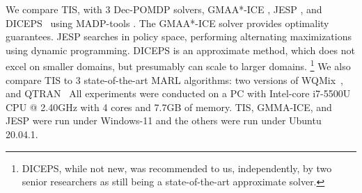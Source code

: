 \documentclass[runningheads]{llncs}
\newcommand{\citep}{\cite}
\begin{document}
We compare TIS, with 3 Dec-POMDP solvers, GMAA*-ICE \citep{GMAAICE}, JESP \citep{JESP}, 
and DICEPS~\cite{DICEPS} using MADP-tools \citep{MADP}.
The GMAA*-ICE solver provides optimality guarantees.
JESP searches in policy space, performing alternating maximizations using dynamic programming. DICEPS is an approximate method, which does not excel on smaller domains, but presumably can scale to larger domains.%
\footnote{DICEPS, while not new, was recommended to us, independently, by two senior researchers as still being a state-of-the-art approximate solver.}
We also compare TIS to 3 state-of-the-art MARL algorithms: 
two versions of WQMix~\cite{WQmix}, and QTRAN~\cite{Qtran}
All experiments were conducted on a PC with Intel-core i7-5500U CPU @ 2.40GHz with 4 cores and 7.7GB of memory. TIS, GMMA-ICE, and JESP were run under Windows-11
and the others were run under Ubuntu 20.04.1.




\end{document}
